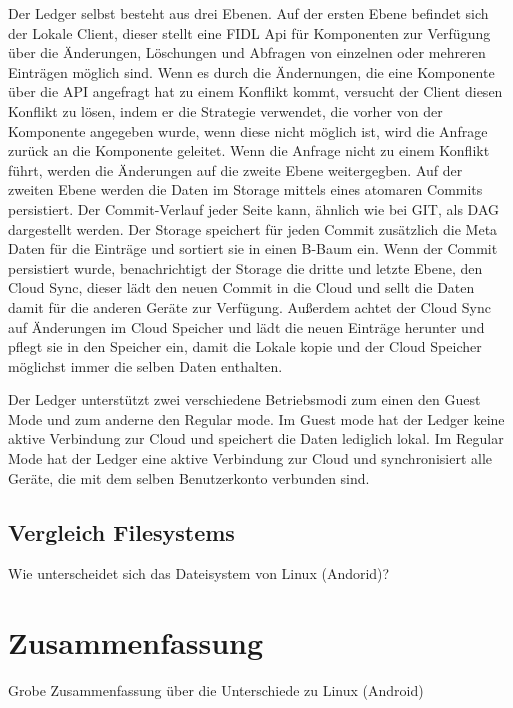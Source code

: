 \documentclass[a4paper]{scrartcl}
\begin{document}
Der Ledger selbst besteht aus drei Ebenen. Auf der ersten Ebene befindet sich der Lokale Client, dieser stellt eine FIDL Api für Komponenten zur Verfügung über die Änderungen, Löschungen und Abfragen von einzelnen oder mehreren Einträgen möglich sind. Wenn es durch die Ändernungen, die eine Komponente über die API angefragt hat zu einem Konflikt kommt, versucht der Client diesen Konflikt zu lösen, indem er die Strategie verwendet, die vorher von der Komponente angegeben wurde, wenn diese nicht möglich ist, wird die Anfrage zurück an die Komponente geleitet. Wenn die Anfrage nicht zu einem Konflikt führt, werden die Änderungen auf die zweite Ebene weitergegben. Auf der zweiten Ebene werden die Daten im Storage mittels eines atomaren Commits persistiert. Der Commit-Verlauf jeder Seite kann, ähnlich wie bei GIT, als DAG dargestellt werden. Der Storage speichert für jeden Commit zusätzlich die Meta Daten für die Einträge und sortiert sie in einen B-Baum ein. Wenn der Commit persistiert wurde, benachrichtigt der Storage die dritte und letzte Ebene, den Cloud Sync, dieser lädt den neuen Commit in die Cloud und sellt die Daten damit für die anderen Geräte zur Verfügung. Außerdem achtet der Cloud Sync auf Änderungen im Cloud Speicher und lädt die neuen Einträge herunter und pflegt sie in den Speicher ein, damit die Lokale kopie und der Cloud Speicher möglichst immer die selben Daten enthalten. 

Der Ledger unterstützt zwei verschiedene Betriebsmodi zum einen den Guest Mode und zum anderne den Regular mode. Im Guest mode hat der Ledger keine aktive Verbindung zur Cloud und speichert die Daten lediglich lokal. Im Regular Mode hat der Ledger eine aktive Verbindung zur Cloud und synchronisiert alle Geräte, die mit dem selben Benutzerkonto verbunden sind.
\subsection{Vergleich Filesystems}
Wie unterscheidet sich das Dateisystem von Linux (Andorid)?
\section{Zusammenfassung}
Grobe Zusammenfassung über die Unterschiede zu Linux (Android)



\end{document}

